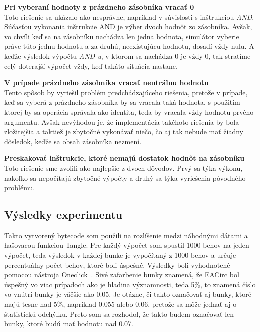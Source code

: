 \begin{myItemize}
 \item \textbf{Pri vyberaní hodnoty z prázdneho zásobníka vracať 0}\\Toto riešenie sa ukázalo ako nesprávne, napríklad v súvislosti s inštrukciou \textit{AND}. Súčasťou vykonania inštrukcie AND je výber dvoch hodnôt zo zásobníka. Avšak, vo chvíli keď sa na zásobníku nachádza len jedna hodnota, simulátor vyberie práve túto jednu hodnotu a za druhú, neexistujúcu hodnotu, dosadí vždy nulu. A keďže výsledok výpočtu \textit{AND-u}, v ktorom sa nachádza 0 je vždy 0, tak stratíme celý doterajší výpočet vždy, keď takáto situácia nastane.
 \item \textbf{V prípade prázdneho zásobníka vracať neutrálnu hodnotu}\\Tento spôsob by vyriešil problém predchádzajúceho riešenia, pretože v prípade, keď sa vyberá z prázdneho zásobníka by sa vracala taká hodnota, s použitím ktorej by sa operácia správala ako identita, teda by vracala vždy hodnotu prvého argumentu. Avšak nevýhodou je, že implementácia takéhoto riešenia by bola zložitejšia a taktiež je zbytočné vykonávať niečo, čo aj tak nebude mať žiadny dôsledok, keďže sa obsah zásobníka nezmení.
 \item \textbf{Preskakovať inštrukcie, ktoré nemajú dostatok hodnôt na zásobníku}\\Toto riešenie sme zvolili ako najlepšie z dvoch dôvodov. Prvý sa týka výkonu, nakoľko sa nepočítajú zbytočné výpočty a druhý sa týka vyriešenia pôvodného problému. 
\end{myItemize}

\subsection{Výsledky experimentu}
\label{subsec:exp1-results}

Takto vytvorený bytecode som použili na rozlíšenie medzi náhodnými dátami a hašovacou funkciou Tangle. Pre každý výpočet som spustil 1000 behov na jeden výpočet, teda výsledok v každej bunke je vypočítaný z 1000 behov a určuje percentuálny počet behov, ktoré boli úspešné. Výsledky boli vyhodnotené pomocou nástroja Oneclick~\cite{obratil-bc}. Sivé zafarbenie bunky znamená, že EACirc bol úspešný vo viac prípadoch ako je hladina významnosti, teda 5\%, to znamená číslo vo vnútri bunky je väčšie ako 0.05. Je otázne, či takto označovať aj bunky, ktoré majú tesne nad 5\%, napríklad 0.055 alebo 0.06, pretože sa môže jednať aj o štatistickú odchýlku. Preto som sa rozhodol, že takto budem označovať len bunky, ktoré budú mať hodnotu nad 0.07.
 
